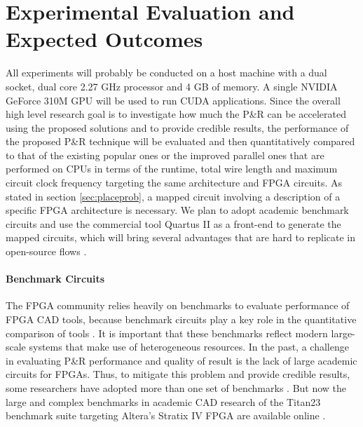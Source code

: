 \documentclass[a4paper,oneside,12pt]{article}
\begin{document}




\section{Experimental Evaluation and Expected Outcomes}

All experiments will probably be conducted on a host machine with a dual socket, dual core 2.27 GHz processor and 4 GB of memory. A single NVIDIA GeForce 310M GPU will be used to run CUDA applications.
Since the overall high level research goal is to investigate how much the P\&R can be accelerated using the proposed solutions and to provide credible results, the performance of the proposed P\&R technique will be evaluated and then quantitatively compared to that of the existing popular ones or the improved parallel ones that are performed on CPUs in terms of the runtime, total wire length and maximum circuit clock frequency targeting the same architecture and FPGA circuits. As stated in section \ref{sec:placeprob}, a mapped circuit involving a description of a specific FPGA architecture is necessary. We plan to adopt academic benchmark circuits and use the commercial tool Quartus II as a front-end to generate the mapped circuits, which will bring several advantages that are hard to replicate in open-source flows \cite{murray2015timing}.

\paragraph{Benchmark Circuits}
The FPGA community relies heavily on benchmarks to evaluate performance of FPGA CAD tools, because benchmark circuits play a key role in the quantitative comparison of tools \cite{murray2015timing}. It is important that these benchmarks reflect modern large-scale systems that make use of heterogeneous resources.
In the past, a challenge in evaluating P\&R performance and quality of result is the lack of large academic circuits for FPGAs. Thus, to mitigate this problem and provide credible results, some researchers have adopted more than one set of benchmarks \cite{bian2010towards}. But now the large and complex benchmarks in academic CAD research of the Titan23 benchmark suite targeting Altera's Stratix IV FPGA are available online \cite{Titan23}.
\end{document}
